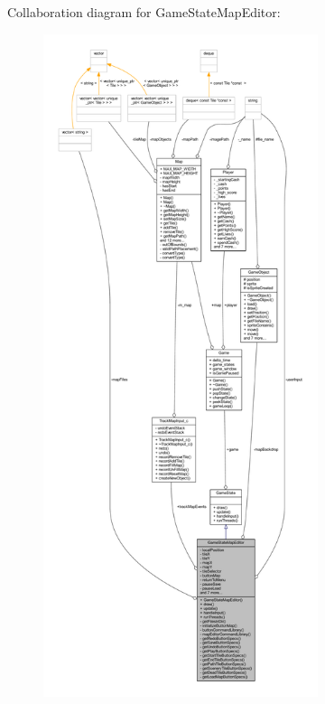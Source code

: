 Collaboration diagram for Game\+State\+Map\+Editor\+:
\nopagebreak
\begin{figure}[H]
\begin{center}
\leavevmode
\includegraphics[height=550pt]{class_game_state_map_editor__coll__graph}
\end{center}
\end{figure}
